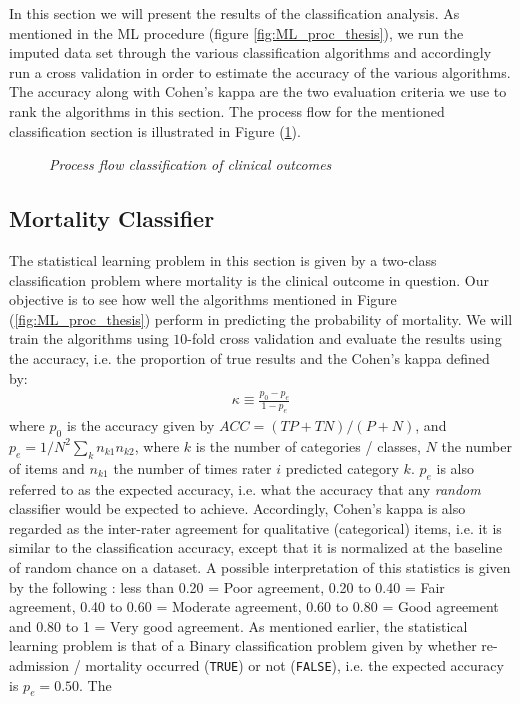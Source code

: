\documentclass[../thesis.tex]{subfiles}
\begin{document}
\noindent In this section we will present the results of the classification analysis. As mentioned in the ML procedure (figure \ref{fig:ML_proc_thesis}), we run the imputed data set through the various classification algorithms and accordingly run a cross validation in order to estimate the accuracy of the various algorithms. The accuracy along with Cohen’s kappa are the two evaluation criteria we use to rank the algorithms in this section. The process flow for the mentioned classification section is illustrated in Figure (\ref{fig:process_flow_classification}). 

\begin{figure}
    \centering
    
    \caption[Process flow classification of clinical outcomes]{\textit{Process flow classification of clinical outcomes}}
    \label{fig:process_flow_classification}
\end{figure}

\subsection{Mortality Classifier}

\noindent The statistical learning problem in this section is given by a two-class classification problem where mortality is the clinical outcome in question. Our objective is to see how well the algorithms mentioned in Figure (\ref{fig:ML_proc_thesis}) perform in predicting the probability of mortality. We will train the algorithms using $10$-fold cross validation and evaluate the results using the accuracy, i.e. the proportion of true results and the Cohen's kappa defined by:
\begin{align}
    \kappa \equiv \frac{p_0 - p_e}{1 - p_e}
\end{align}
where $p_0$ is the accuracy given by ${\mathit  {ACC}}=({\mathit  {TP}}+{\mathit  {TN}})/(P+N)$, and $p_e = 1 / N^2 \sum_{k} n_{k1}n_{k2}$, where $k$ is the number of categories / classes, $N$ the number of items and $n_{k1}$ the number of times rater $i$ predicted category $k$. $p_e$ is also referred to as the expected accuracy, i.e. what the accuracy that any \textit{random} classifier would be expected to achieve. Accordingly, Cohen's kappa is also regarded as the inter-rater agreement for qualitative (categorical) items, i.e. it is similar to the classification accuracy, except that it is normalized at the baseline of random chance on a dataset. A possible interpretation of this statistics is given by the following \citep{ashby1991practical}: less than 0.20 = Poor agreement, 0.20 to 0.40 = Fair agreement, 0.40 to 0.60 = Moderate agreement, 0.60 to 0.80 = Good agreement and 0.80 to 1 = Very good agreement. As mentioned earlier, the statistical learning problem is that of a Binary classification problem given by whether  re-admission / mortality occurred (\texttt{TRUE}) or not (\texttt{FALSE}), i.e. the expected accuracy is $p_e = 0.50$. The  
\end{document}
